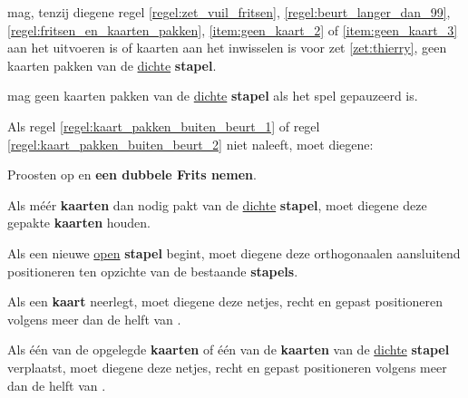 
\vervolgLijst{}
\item \EenSpeler mag, tenzij diegene regel \ref{regel:zet_vuil_fritsen}, \ref{regel:beurt_langer_dan_99}, \ref{regel:fritsen_en_kaarten_pakken}, \ref{item:geen_kaart_2} of \ref{item:geen_kaart_3} aan het uitvoeren is of kaarten aan het inwisselen is voor zet \ref{zet:thierry}, geen kaarten pakken van de \ul{dichte} \textbf{stapel}.
\label{regel:kaart_pakken_buiten_beurt_1}
\eindLijst{}

\vervolgLijst{}
\item \EenSpeler mag geen kaarten pakken van de \ul{dichte} \textbf{stapel} als het spel gepauzeerd is.
\label{regel:kaart_pakken_buiten_beurt_2}
\eindLijst{}

\vervolgLijst{}
\item Als \eenSpeler regel \ref{regel:kaart_pakken_buiten_beurt_1} of regel \ref{regel:kaart_pakken_buiten_beurt_2} niet naleeft, moet diegene:
\puntLijst{}
\item Proosten op  en \textbf{een dubbele Frits nemen}\footnotemark[1].
\eindPuntLijst{}
\label{regel:kaart_pakken_buiten_beurt_straf}
\eindLijst{}

\vervolgLijst{}
\item Als \eenSpeler méér \textbf{kaarten} dan nodig pakt van de \ul{dichte} \textbf{stapel}, moet diegene deze gepakte \textbf{kaarten} houden.
\eindLijst{}


\vervolgLijst{}
\item Als \eenSpeler een nieuwe \ul{open} \textbf{stapel} begint, moet diegene deze orthogonaal\footnotemark[2] en aansluitend positioneren ten opzichte van de bestaande \textbf{stapels}.
\label{regel:kaart_netjes_1}
\eindLijst{}

\vervolgLijst{}
\item Als \eenSpeler een \textbf{kaart} neerlegt, moet diegene deze netjes, recht en gepast positioneren volgens meer dan de helft van \alleSpelersN.
\label{regel:kaart_netjes_2}
\eindLijst{}

\vervolgLijst{}
\item Als \eenSpeler één van de opgelegde \textbf{kaarten} of één van de \textbf{kaarten} van de \ul{dichte} \textbf{stapel} verplaatst, moet diegene deze netjes, recht en gepast positioneren volgens meer dan de helft van \alleSpelersN.
\label{regel:kaart_netjes_3}
\eindLijst{}

